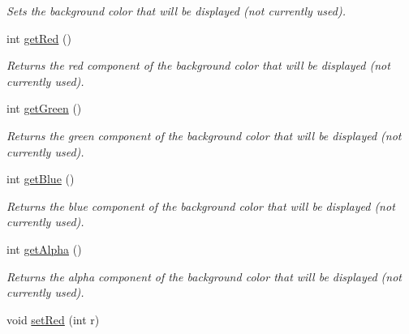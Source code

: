\begin{DoxyCompactItemize}
\begin{DoxyCompactList}\small\item\em Sets the background color that will be displayed (not currently used). \end{DoxyCompactList}\item 
\hypertarget{class_picto_1_1_state_ac9d6f38f9378eec2ce7b6922578f6188}{int \hyperlink{class_picto_1_1_state_ac9d6f38f9378eec2ce7b6922578f6188}{get\-Red} ()}\label{class_picto_1_1_state_ac9d6f38f9378eec2ce7b6922578f6188}

\begin{DoxyCompactList}\small\item\em Returns the red component of the background color that will be displayed (not currently used). \end{DoxyCompactList}\item 
\hypertarget{class_picto_1_1_state_a414d1d7cbed43761f7ca6e4d36bd5baa}{int \hyperlink{class_picto_1_1_state_a414d1d7cbed43761f7ca6e4d36bd5baa}{get\-Green} ()}\label{class_picto_1_1_state_a414d1d7cbed43761f7ca6e4d36bd5baa}

\begin{DoxyCompactList}\small\item\em Returns the green component of the background color that will be displayed (not currently used). \end{DoxyCompactList}\item 
\hypertarget{class_picto_1_1_state_a63a2d684114c788d710e7f2082286b1a}{int \hyperlink{class_picto_1_1_state_a63a2d684114c788d710e7f2082286b1a}{get\-Blue} ()}\label{class_picto_1_1_state_a63a2d684114c788d710e7f2082286b1a}

\begin{DoxyCompactList}\small\item\em Returns the blue component of the background color that will be displayed (not currently used). \end{DoxyCompactList}\item 
\hypertarget{class_picto_1_1_state_a33d0687b01c64dd3a0463e4c96f67ac6}{int \hyperlink{class_picto_1_1_state_a33d0687b01c64dd3a0463e4c96f67ac6}{get\-Alpha} ()}\label{class_picto_1_1_state_a33d0687b01c64dd3a0463e4c96f67ac6}

\begin{DoxyCompactList}\small\item\em Returns the alpha component of the background color that will be displayed (not currently used). \end{DoxyCompactList}\item 
\hypertarget{class_picto_1_1_state_af145767b36558a4e98e94494e2b7ce46}{void \hyperlink{class_picto_1_1_state_af145767b36558a4e98e94494e2b7ce46}{set\-Red} (int r)}\label{class_picto_1_1_state_af145767b36558a4e98e94494e2b7ce46}


\end{DoxyCompactItemize}
